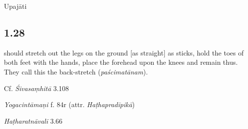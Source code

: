 \begin{ekdosis}
\begin{metre}[hp01_027]
Upajāti
\end{metre}

\subsection*{1.28}
\begin{translation} should stretch out the legs on the ground [as straight] as sticks, hold the toes of both feet with the hands, place the forehead upon the knees and remain thus. They call this the back-stretch (\emph{paścimatānam}).%
\end{translation}

\begin{sources}[hp01_028]
Cf. \emph{Śivasaṃhitā} 3.108

\begin{versinnote}
\end{versinnote}

\end{sources}

\begin{testimonia}[hp01_028]
\emph{Yogacintāmaṇi} f. 84r (attr. \emph{Haṭhapradīpikā})

\begin{versinnote}
\end{versinnote}

\emph{Haṭharatnāvalī} 3.66

\begin{versinnote}
\tl{\var{dorbhyāṃ padāgradvitayaṃ ] dvābhyāṃ karābhyāṃ dvitayaṃ n1,n3}\\!}
\end{versinnote}


\end{testimonia}
\end{ekdosis}
